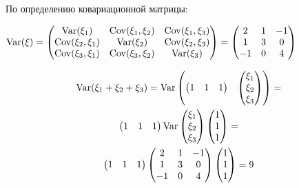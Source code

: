 \documentclass[pdftex,11pt,openany]{book}\usepackage[]{graphicx}\usepackage[]{color}
\begin{document}
\begin{solution}
По определению ковариационной матрицы:

$\operatorname{Var} (\xi) =  \begin{pmatrix}
\operatorname{Var} (\xi_1) & \operatorname{Cov} (\xi_1, \xi_2) & \operatorname{Cov} (\xi_1, \xi_3) \\
\operatorname{Cov} (\xi_2, \xi_1) & \operatorname{Var} (\xi_2) & \operatorname{Cov} (\xi_2, \xi_3) \\
\operatorname{Cov} (\xi_3, \xi_1) & \operatorname{Cov} (\xi_3, \xi_2) & \operatorname{Var} (\xi_3) \\
\end{pmatrix}  =  \begin{pmatrix}
2 & 1 & -1 \\
1 & 3 & 0 \\
-1 & 0 & 4 \\
\end{pmatrix} $

\begin{multline}
\operatorname{Var} (\xi_1 + \xi_2 + \xi_3)  = \operatorname{Var}   \begin{pmatrix} 
 \begin{pmatrix}
1 & 1 & 1 \\
\end{pmatrix}  &  \begin{pmatrix}
\xi_1 \\
\xi_2 \\
\xi_3 \\
\end{pmatrix} 
\end{pmatrix}  = \\  
\begin{pmatrix}
1 & 1 & 1 \\
\end{pmatrix}  \operatorname{Var}   \begin{pmatrix}
\xi_1 \\
\xi_2 \\
\xi_3 \\
\end{pmatrix}   \begin{pmatrix}
1 \\
1 \\
1 \\
\end{pmatrix}  = \\
 \begin{pmatrix}
1 & 1 & 1 \\
\end{pmatrix}   \begin{pmatrix}
2 & 1 & -1 \\
1 & 3 & 0 \\
-1 & 0 & 4 \\
\end{pmatrix}   \begin{pmatrix}
1 \\
1 \\
1 \\
\end{pmatrix}  = 9
\end{multline}
\end{solution}
\end{document}
